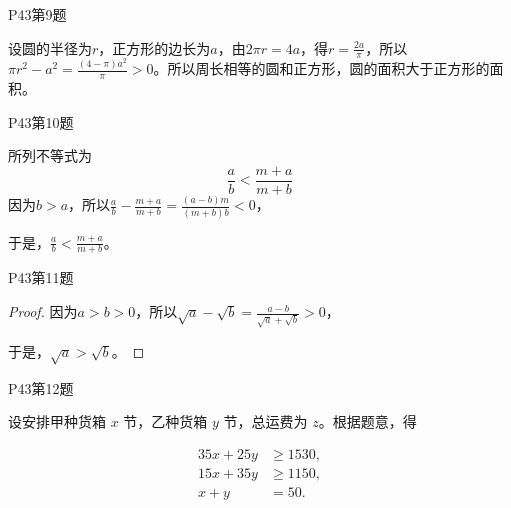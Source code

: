 \documentclass[12pt,aspectratio=169,t,fleqn]{beamer}
\begin{document}
\begin{frame}{P43第9题}
	\begin{solution}
		设圆的半径为$r$，正方形的边长为$a$，由$2\pi r = 4a$，得$r=\frac{2a}{\pi}$，所以$\pi r^2 -a^2 = \frac{(4-\pi)a^2}{\pi}>0$。所以周长相等的圆和正方形，圆的面积大于正方形的面积。
	\end{solution}
\end{frame}


\begin{frame}{P43第10题}
	\begin{solution}
	\upshape	所列不等式为\[
		\frac{a}{b}<\frac{m+a}{m+b}
		\]
		因为$b>a$，所以$\frac{a}{b} - \frac{m+a}{m+b} = \frac{(a-b)m}{(m+b)b} < 0$，
		
		于是，$\frac{a}{b} < \frac{m+a}{m+b}$。
	\end{solution}
\end{frame}


\begin{frame}{P43第11题}
	\begin{proof}
		因为$a>b>0$，所以$\sqrt{a} - \sqrt{b} = \frac{a-b}{\sqrt{a} + \sqrt{b}} >0$，
		
		于是，$\sqrt{a} > \sqrt{b}$。
	\end{proof}
\end{frame}


\begin{frame}{P43第12题}
	\begin{solution}
		\upshape
		设安排甲种货箱 $x$ 节，乙种货箱 $y$ 节，总运费为 $z$。根据题意，得
	
		\begin{align}
			35x+25y &\ge 1530, \tag{1}\\
			15x+35y &\ge 1150, \tag{2}\\
			x+y &= 50. \tag{3}
		\end{align}
		
		
		
	\end{solution}
\end{frame}
\end{document}
